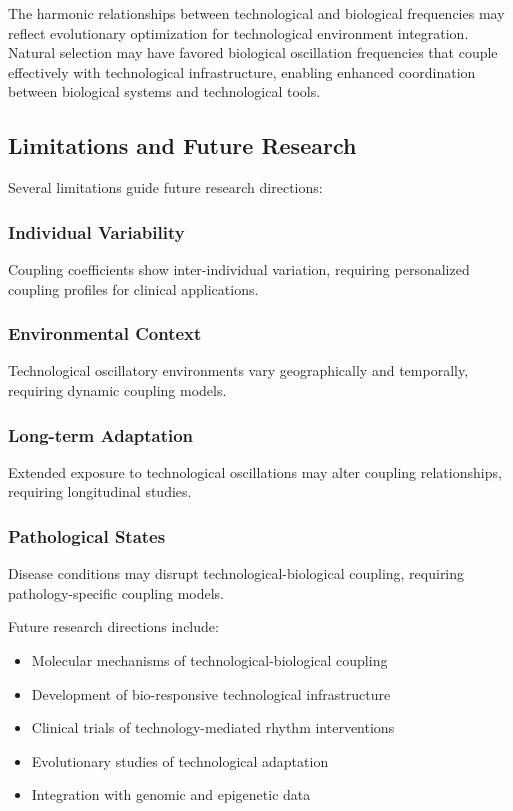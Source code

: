 \documentclass[12pt]{article}
\begin{document}
The harmonic relationships between technological and biological frequencies may reflect evolutionary optimization for technological environment integration. Natural selection may have favored biological oscillation frequencies that couple effectively with technological infrastructure, enabling enhanced coordination between biological systems and technological tools.

\subsection{Limitations and Future Research}

Several limitations guide future research directions:

\subsubsection{Individual Variability}
Coupling coefficients show inter-individual variation, requiring personalized coupling profiles for clinical applications.

\subsubsection{Environmental Context}
Technological oscillatory environments vary geographically and temporally, requiring dynamic coupling models.

\subsubsection{Long-term Adaptation}
Extended exposure to technological oscillations may alter coupling relationships, requiring longitudinal studies.

\subsubsection{Pathological States}
Disease conditions may disrupt technological-biological coupling, requiring pathology-specific coupling models.

Future research directions include:
\begin{itemize}
\item Molecular mechanisms of technological-biological coupling
\item Development of bio-responsive technological infrastructure
\item Clinical trials of technology-mediated rhythm interventions
\item Evolutionary studies of technological adaptation
\item Integration with genomic and epigenetic data
\end{itemize}
\end{document}
